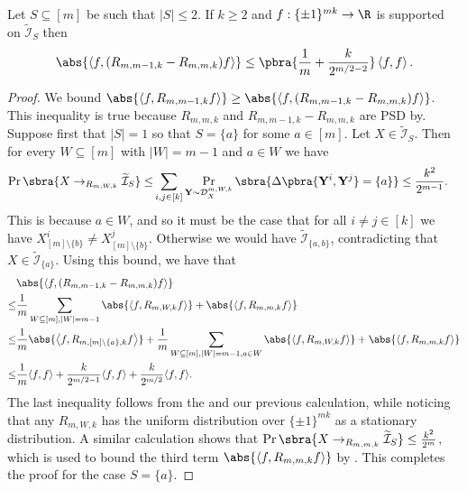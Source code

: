 \begin{lemma}\label{lem:square terms B=1}
    Let $S\subseteq[m]$ be such that $|S|\leq 2$. If $k\geq 2$ and $f:\{\pm1\}^{mk}\to\R$ is supported on $\widetilde{\mathcal{I}}_S$ then 
    \begin{align*}
        \abs{\left\langle f,(R_{m,m-1,k}-R_{m,m,k})f\right\rangle }\leq\pbra{\frac1m+\frac{k}{2^{m/2-2}}}\left\langle f,f\right\rangle.
    \end{align*}
\end{lemma}
\begin{proof}
    We bound $\abs{ \left\langle f,R_{m,m-1,k}f\right\rangle }\geq \abs{ \left\langle f,(R_{m,m-1,k}-R_{m,m,k})f\right\rangle }$. This inequality is true because $R_{m,m,k}$ and $R_{m,m-1,k}-R_{m,m,k}$ are PSD by. Suppose first that $|S|=1$ so that $S=\{a\}$ for some $a\in[m]$. Let $X\in\widetilde{\mathcal{I}}_S$. Then for every $W\subseteq[m]$ with $|W|=m-1$ and $a\in W$ we have
    \begin{align*}
        \Pr\sbra{X\to_{R_{m,W,k}} \widetilde{\mathcal{I}}_S}
        \leq& \sum_{i,j\in[k]}\Pr_{\mathbf{Y}\sim \mathcal{D}_X^{m,W,k}}\sbra{\Delta\pbra{\mathbf{Y}^i,\mathbf{Y}^j}=\{a\}}
        \leq  \frac{k^2}{2^{m-1}}.
    \end{align*}
    This is because $a\in W$, and so it must be the case that for all $i\neq j\in[k]$ we have $X^i_{[m]\setminus\{b\}}\neq X^j_{[m]\setminus\{b\}}$. Otherwise we would have $\widetilde{\mathcal I}_{\{a,b\}}$, contradicting that $X\in \widetilde{\mathcal I}_{\{a\}}$. Using this bound, we have that
    \begin{align*}
        &\abs{\left\langle f,(R_{m,m-1,k}-R_{m,m,k})f\right\rangle }\\
        \leq&\frac1m\sum_{W\subseteq [m],|W|=m-1}\abs{\left\langle f,R_{m,W,k}f\right\rangle }+\abs{\left\langle f,R_{m,m,k}f\right\rangle }\\
        \leq&\frac1m\abs{\left\langle f,R_{m,[m]\setminus\{a\},k}f\right\rangle }+ \frac1m\sum_{W\subseteq [m],|W|=m-1,a\in W}\abs{\left\langle f,R_{m,W,k}f\right\rangle }+\abs{\left\langle f,R_{m,m,k}f\right\rangle }\\
        \leq&\frac1m\langle f,f\rangle+  \frac{k}{2^{m/2-1}}\langle f,f\rangle+ \frac{k}{2^{m/2}}\langle f,f\rangle.
    \end{align*}
    The last inequality follows from the  and our previous calculation, while noticing that any $R_{m,W,k}$ has the uniform distribution over $\{\pm1\}^{mk}$ as a stationary distribution. A similar calculation shows that $\Pr\sbra{X\to_{R_{m,m,k}} \widetilde{\mathcal{I}}_S}\leq \frac{k^2}{2^{m}}$, which is used to bound the third term $\abs{\left\langle f,R_{m,m,k}f\right\rangle }$ by . This completes the proof for the case $S=\{a\}$.


\end{proof}
